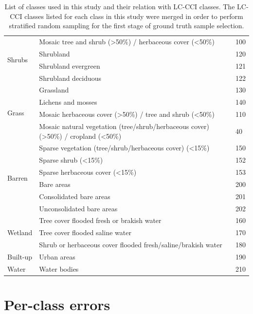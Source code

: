 \documentclass[a4paper,12pt]{scrbook}
\begin{document}
\begin{appendices}
\begin{table}[!ht]
\begin{center}
\begin{tabular}{lp{10.5cm}l}
	\hline
	\multirow{4}{*}{Shrubs} & Mosaic tree and shrub (>50\%) / herbaceous cover (<50\%) & 100 \\
	  & Shrubland & 120 \\
	  & Shrubland evergreen & 121 \\
	  & Shrubland deciduous & 122 \\
	\hline
	\multirow{4}{*}{Grass} & Grassland & 130 \\
	  & Lichens and mosses & 140 \\
	  & Mosaic herbaceous cover (>50\%) / tree and shrub (<50\%) & 110 \\
	  & Mosaic natural vegetation (tree/shrub/herbaceous cover) (>50\%) / cropland (<50\%) & 40 \\
	\hline
	\multirow{6}{*}{Barren} & Sparse vegetation (tree/shrub/herbaceous cover) (<15\%) & 150 \\
	  & Sparse shrub (<15\%) & 152 \\
	  & Sparse herbaceous cover (<15\%) & 153 \\
	  & Bare areas & 200 \\
	  & Consolidated bare areas & 201 \\
	  & Unconsolidated bare areas & 202 \\
	\hline
	\multirow{3}{*}{Wetland} & Tree cover flooded fresh or brakish water & 160 \\
	  & Tree cover flooded saline water & 170 \\
	  & Shrub or herbaceous cover flooded fresh/saline/brakish water & 180 \\
	\hline
	Built-up & Urban areas & 190 \\
	\hline
	Water & Water bodies & 210 \\
	\hline
      \end{tabular}
  \end{center}
  \caption{List of classes used in this study and their relation with LC-CCI classes. The LC-CCI classes listed for each class in this study were merged in order to perform stratified random sampling for the first stage of ground truth sample selection.}
  \label{tbl-classes}
 \end{table}
 
 \chapter{Per-class errors}

\end{appendices}
\end{document}
